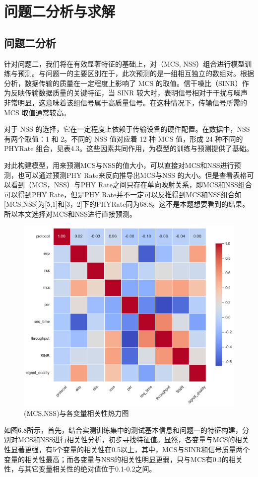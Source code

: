 \section{问题二分析与求解}
\subsection{问题二分析}
针对问题二，我们将在有效显著特征的基础上，对（MCS, NSS）组合进行模型训练与预测。与问题一的主要区别在于，此次预测的是一组相互独立的数组对。根据分析，数据传输的质量在一定程度上影响了 MCS 的取值。信干噪比（SINR）作为反映传输数据质量的关键特征，当 SINR 较大时，表明信号相对于干扰与噪声非常明显，这意味着该组信号属于高质量信号。在这种情况下，传输信号所需的 MCS 取值通常较高。

对于 NSS 的选择，它在一定程度上依赖于传输设备的硬件配置。在数据中，NSS 有两个取值：1 和 2。不同的 NSS 值对应着 12 种 MCS 值，形成 24 种不同的 PHYRate 组合，见表4.3。这些因素共同作用，为模型的训练与预测提供了基础。



对此构建模型，用来预测MCS与NSS的值大小，可以直接对MCS和NSS进行预测，也可以通过预测PHY Rate来反向推导出MCS与NSS 的大小。但是查看表格可以看到（MCS，NSS）与PHY Rate之间只存在单向映射关系，即MCS和NSS组合可以得到PHY Rate，但是PHY Rate并不一定可以反推得到MCS和NSS组合如[MCS,NSS]为[5,1]和[3，2]下的PHYRate同为68.8。这不是本题想要看到的结果。所以本文选择对MCS和NSS进行直接预测。


\begin{figure}[H]
	\centering
	\includegraphics[width=0.7\linewidth]{figures/问题2热力图}
	\caption{(MCS,NSS)与各变量相关性热力图}
	\label{fig:2}
\end{figure}


如图6.8所示，首先，结合实测训练集中的测试基本信息和问题一的特征构建，分别对MCS和NSS进行相关性分析，初步寻找特征值。显然，各变量与MCS的相关性显著更强，有5个变量的相关性在0.5以上，其中，MCS与SINR和信号质量两个变量的相关性最高；而各变量与NSS的相关性明显更弱，只与MCS有0.3的相关性，与其它变量相关性的绝对值位于0.1-0.2之间。



